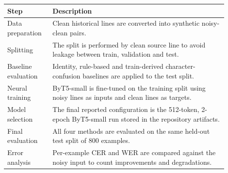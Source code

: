 \begin{tabular}{p{0.18\linewidth}p{0.72\linewidth}}
\toprule
Step & Description \\
\midrule
Data preparation & Clean historical lines are converted into synthetic noisy-clean pairs. \\
Splitting & The split is performed by clean source line to avoid leakage between train, validation and test. \\
Baseline evaluation & Identity, rule-based and train-derived character-confusion baselines are applied to the test split. \\
Neural training & ByT5-small is fine-tuned on the training split using noisy lines as inputs and clean lines as targets. \\
Model selection & The final reported configuration is the 512-token, 2-epoch ByT5-small run stored in the repository artifacts. \\
Final evaluation & All four methods are evaluated on the same held-out test split of 800 examples. \\
Error analysis & Per-example CER and WER are compared against the noisy input to count improvements and degradations. \\
\bottomrule
\end{tabular}
